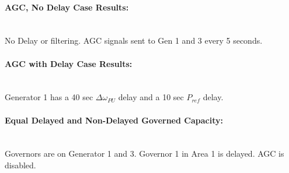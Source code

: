 \documentclass[12pt]{article}
\begin{document}
\pagebreak
\renewcommand{\caseName}{SixMachineDelayStep1}

\paragraph{AGC, No Delay Case Results:} \ \\
No Delay or filtering. AGC signals sent to Gen 1 and 3 every 5 seconds.
\\
\resultPres

\pagebreak
\renewcommand{\caseName}{SixMachineDelayStep3}
\paragraph{AGC with Delay Case Results: } \ \\
Generator 1 has a 40 sec $\Delta \omega_{PU}$ delay and a 10 sec $P_{ref}$ delay.
\\
\resultPres

\pagebreak
\renewcommand{\caseName}{SixMachineDelayStep5}
\paragraph{Equal  Delayed and Non-Delayed Governed Capacity: } \ \\
Governors are on Generator 1 and 3. Governor 1 in Area 1 is delayed. AGC is disabled.
\\
\resultPres
\end{document}
